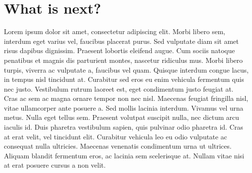 \section{What is next?}
Lorem ipsum dolor sit amet, consectetur adipiscing elit. Morbi libero sem,
interdum eget varius vel, faucibus placerat purus. Sed vulputate diam sit amet
risus dapibus dignissim. Praesent lobortis eleifend augue. Cum sociis natoque
penatibus et magnis dis parturient montes, nascetur ridiculus mus. Morbi libero
turpis, viverra ac vulputate a, faucibus vel quam. Quisque interdum congue
lacus, in tempus nisl tincidunt at. Curabitur sed eros eu enim vehicula
fermentum quis nec justo. Vestibulum rutrum laoreet est, eget condimentum justo
feugiat at. Cras ac sem ac magna ornare tempor non nec nisl. Maecenas feugiat
fringilla nisl, vitae ullamcorper ante posuere a. Sed mollis lacinia interdum.
Vivamus vel urna metus. Nulla eget tellus sem. Praesent volutpat suscipit nulla,
nec dictum arcu iaculis id. Duis pharetra vestibulum sapien, quis pulvinar odio
pharetra id. Cras at erat velit, vel tincidunt elit. Curabitur vehicula leo eu
odio vulputate ac consequat nulla ultricies. Maecenas venenatis condimentum
urna ut ultrices. Aliquam blandit fermentum eros, ac lacinia sem scelerisque
at. Nullam vitae nisi at erat posuere cursus a non velit.
